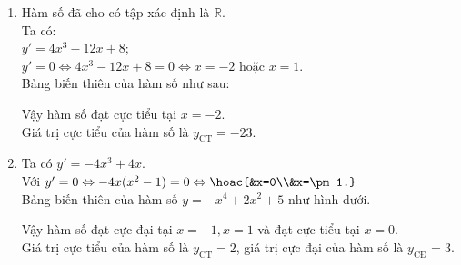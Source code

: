 \begin{bt}
{\begin{enumerate}
            Vậy hàm số đạt cực đại tại $x=1$ và đạt cực tiểu tại $x=-1$.\\
            Giá trị cực tiểu của hàm số là $y_{\text{CT}}=-6$, giá trị cực đại của hàm số là $y_{\text{CĐ}}=-2$.
            \item
            Hàm số đã cho có tập xác định là $\mathbb{R}$.\\
            Ta có:\\ $y'=4x^3-12x+8$;\\
            $y'=0\Leftrightarrow 4x^3-12x+8=0\Leftrightarrow x=-2$ hoặc $x=1$.\\
            Bảng biến thiên của hàm số như sau:
            \begin{center}
            \end{center}
            Vậy hàm số đạt cực tiểu tại $x=-2$.\\
            Giá trị cực tiểu của hàm số là $y_{\text{CT}}=-23$.
            \item
            Ta có $y'=-4x^3+4x$.\\
            Với $y'=0\Leftrightarrow -4x(x^2-1)=0\Leftrightarrow\hoac{&x=0\\&x=\pm1.}$\\
            Bảng biến thiên của hàm số $y=-x^4+2x^2+5$ như hình dưới.
            \begin{center}
            \end{center}
            Vậy hàm số đạt cực đại tại $x=-1, x=1$ và đạt cực tiểu tại $x=0$.\\
            Giá trị cực tiểu của hàm số là $y_{\text{CT}}=2$, giá trị cực đại của hàm số là $y_{\text{CĐ}}=3$.
        \end{enumerate}
    }
\end{bt}
